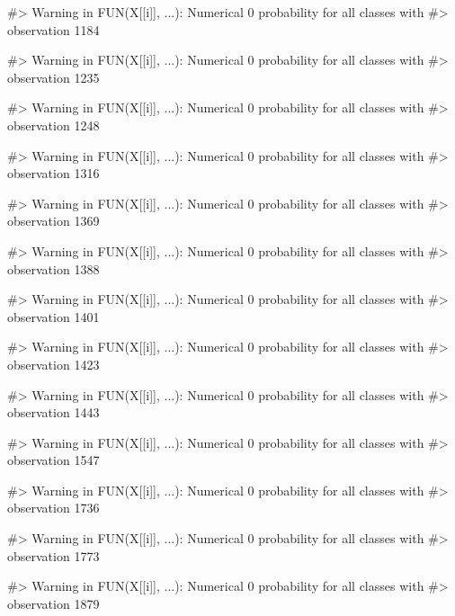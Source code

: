 \begin{Schunk}
\begin{Soutput}
#> Warning in FUN(X[[i]], ...): Numerical 0 probability for all classes with
#> observation 1184
\end{Soutput}
\begin{Soutput}
#> Warning in FUN(X[[i]], ...): Numerical 0 probability for all classes with
#> observation 1235
\end{Soutput}
\begin{Soutput}
#> Warning in FUN(X[[i]], ...): Numerical 0 probability for all classes with
#> observation 1248
\end{Soutput}
\begin{Soutput}
#> Warning in FUN(X[[i]], ...): Numerical 0 probability for all classes with
#> observation 1316
\end{Soutput}
\begin{Soutput}
#> Warning in FUN(X[[i]], ...): Numerical 0 probability for all classes with
#> observation 1369
\end{Soutput}
\begin{Soutput}
#> Warning in FUN(X[[i]], ...): Numerical 0 probability for all classes with
#> observation 1388
\end{Soutput}
\begin{Soutput}
#> Warning in FUN(X[[i]], ...): Numerical 0 probability for all classes with
#> observation 1401
\end{Soutput}
\begin{Soutput}
#> Warning in FUN(X[[i]], ...): Numerical 0 probability for all classes with
#> observation 1423
\end{Soutput}
\begin{Soutput}
#> Warning in FUN(X[[i]], ...): Numerical 0 probability for all classes with
#> observation 1443
\end{Soutput}
\begin{Soutput}
#> Warning in FUN(X[[i]], ...): Numerical 0 probability for all classes with
#> observation 1547
\end{Soutput}
\begin{Soutput}
#> Warning in FUN(X[[i]], ...): Numerical 0 probability for all classes with
#> observation 1736
\end{Soutput}
\begin{Soutput}
#> Warning in FUN(X[[i]], ...): Numerical 0 probability for all classes with
#> observation 1773
\end{Soutput}
\begin{Soutput}
#> Warning in FUN(X[[i]], ...): Numerical 0 probability for all classes with
#> observation 1879
\end{Soutput}

\end{Schunk}
